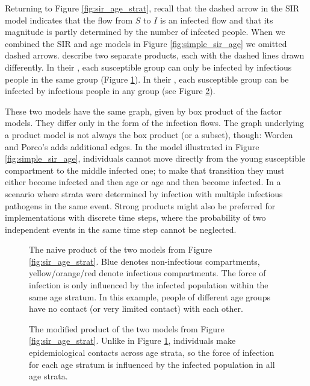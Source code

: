 Returning to Figure \ref{fig:sir_age_strat}, recall that the dashed arrow in the SIR model indicates that the flow from $S$ to $I$ is an infected flow and that its magnitude is partly determined by the number of infected people. When we combined the SIR and age models in Figure \ref{fig:simple_sir_age} we omitted dashed arrows. \cite{worden2017products} describe two separate products, each with the dashed lines drawn differently. In their , each susceptible group can only be infected by infectious people in the same group (Figure \ref{fig:naive_product}). In their , each susceptible group can be infected by infectious people in any group (see Figure \ref{fig:modified_product}). 

These two models have the same graph, given by box product of the factor models. They differ only in the form of the infection flows. The graph underlying a product model is not always the box product (or a subset), though: Worden and Porco's  adds additional edges. In the model illustrated in Figure \ref{fig:simple_sir_age}, individuals cannot move directly from the young susceptible compartment to the middle infected one; to make that transition they must either become infected and then age or age and then become infected. In a scenario where strata were determined by infection with multiple infectious pathogens in the same event. Strong products might also be preferred for implementations with discrete time steps, where the probability of two independent events in the same time step cannot be neglected. 

\begin{figure}
    \centering
    
    \caption{The naive product of the two models from Figure \ref{fig:sir_age_strat}. Blue denotes non-infectious compartments, yellow/orange/red denote infectious compartments. The force of infection is only influenced by the infected population within the same age stratum. In this example, people of different age groups have no contact (or very limited contact) with each other.}
    \label{fig:naive_product}
\end{figure}

\begin{figure}
    \centering
    
    \caption{The modified product of the two models from Figure \ref{fig:sir_age_strat}. Unlike in Figure \ref{fig:naive_product}, individuals make epidemiological contacts across age strata, so the force of infection for each age stratum is influenced by the infected population in all age strata.}
    \label{fig:modified_product}
\end{figure}

